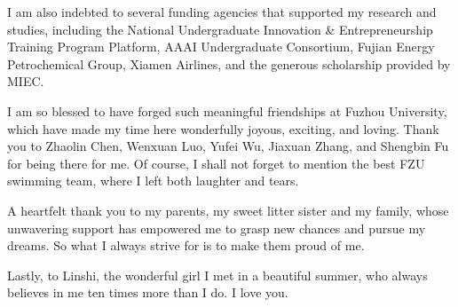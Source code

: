 \vspace{9pt}

I am also indebted to several funding agencies that supported my research and studies, including the National Undergraduate Innovation \& Entrepreneurship Training Program Platform, AAAI Undergraduate Consortium, Fujian Energy Petrochemical Group, Xiamen Airlines, and the generous scholarship provided by MIEC.

\vspace{9pt}

I am so blessed to have forged such meaningful friendships at Fuzhou University, which have made my time here wonderfully joyous, exciting, and loving. Thank you to Zhaolin Chen, Wenxuan Luo, Yufei Wu, Jiaxuan Zhang, and Shengbin Fu for being there for me. Of course, I shall not forget to mention the best FZU swimming team, where I left both laughter and tears.

\vspace{9pt}

A heartfelt thank you to my parents, my sweet litter sister and my family, whose unwavering support has empowered me to grasp new chances and pursue my dreams. So what I always strive for is to make them proud of me.

\vspace{9pt}


Lastly, to Linshi, the wonderful girl I met in a beautiful summer, who always believes in me ten times more than I do. I love you.



\newpage